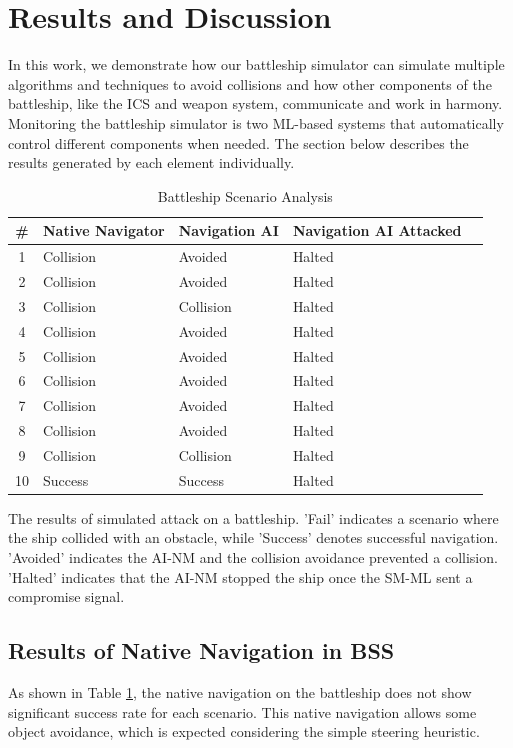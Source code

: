 \documentclass[conference]{IEEEtran}
\begin{document}
\section{Results and Discussion}
 In this work, we demonstrate how our battleship simulator can simulate multiple algorithms and techniques to avoid collisions and how other components of the battleship, like the ICS and weapon system, communicate and work in harmony. Monitoring the battleship simulator is two ML-based systems that automatically control different components when needed. The section below describes the results generated by each element individually. 
\begin{table}
\centering
\caption{Battleship Scenario Analysis}
\label{tab:battleship_scenario}
\footnotesize %
\begin{tabular}{@{}c>{\centering\arraybackslash}p{1.6cm}>{\centering\arraybackslash}p{1.6cm}>{\centering\arraybackslash}p{1.6cm}>{\centering\arraybackslash}p{1.6cm}@{}}
\toprule
\# & Native Navigator & Navigation AI & Navigation AI Attacked \\ \midrule
1  & Collision & Avoided &Halted\\
2  & Collision & Avoided &Halted\\
3  & Collision & Collision &Halted\\
4  & Collision & Avoided &Halted\\
5  & Collision & Avoided &Halted\\
6  & Collision & Avoided &Halted\\
7  & Collision & Avoided &Halted\\
8  & Collision & Avoided &Halted\\
9  & Collision & Collision &Halted\\
10  & Success & Success &Halted\\
\bottomrule
\end{tabular}
\begin{minipage}{0.48\textwidth} %
\footnotesize The results of simulated attack on a battleship. 'Fail' indicates a scenario where the ship collided with an obstacle, while 'Success' denotes successful navigation. 'Avoided' indicates the AI-NM and the collision avoidance prevented a collision. 'Halted' indicates that the AI-NM stopped the ship once the  SM-ML sent a compromise signal.
\end{minipage}
\end{table}
\subsection{Results of Native Navigation in BSS}
As shown in Table \ref{tab:battleship_scenario}, the native navigation on the battleship does not show significant success rate for each scenario. This native navigation allows some object avoidance, which is expected considering the simple steering heuristic. 
\end{document}
